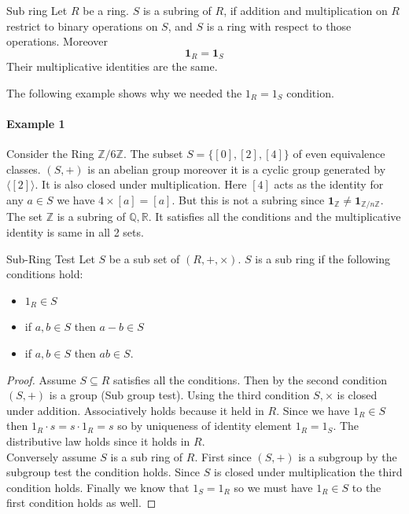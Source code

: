 \documentclass[16pt,a4paper]{article}
\theoremstyle{definition}
\newcommand{\ang}[1]{\langle #1 \rangle}
\begin{document}
\begin{defn}{Sub ring}{}
Let $R$ be a ring. $S$ is a subring of $R$, if addition and multiplication on $R$ restrict to binary operations on $S$, and $S$ is a ring with respect to those operations. Moreover
\[\mathbf{1}_R=\mathbf{1}_S\]
Their multiplicative identities are the same.  
\end{defn}

The following example shows why we needed the $1_R = 1_S$ condition. 

\paragraph{Example 1} Consider the Ring $\mathbb{Z}/6\mathbb{Z}$. The subset $S = \{[0],[2],[4]\}$ of even equivalence classes. $(S,+)$ is an abelian group moreover it is a cyclic group generated by $\ang{[2]}$. It is also closed under multiplication. Here $[4]$ acts as the identity for any $a\in S$ we have $4\times [a] = [a]$. But this is not a subring since $\mathbf{1}_\mathbb{Z}\neq \mathbf{1}_{\mathbb{Z}/n\mathbb{Z}}$.
\\

The set $\mathbb{Z}$ is a subring of $\mathbb{Q,R}$. It satisfies all the conditions and the multiplicative identity is same in all 2 sets. 

\newpage

\begin{thm}{Sub-Ring Test}{}
Let $S$ be a sub set of $(R,+, \times)$.  $S$ is a sub ring if the following conditions hold: 
\begin{itemize}
\item $1_R \in S$ 
\item if $a,b \in S$ then $a-b\in S$
\item if $a,b \in S$ then $ab\in S$. 
\end{itemize}
\end{thm}
\begin{proof}
Assume $S\subseteq R$ satisfies all the conditions. Then by the second condition $(S,+)$ is a group (Sub group test). Using the third condition $S,\times$ is closed under addition. Associatively holds because it held in $R$. Since we have $1_R \in S$ then $1_R\cdot s = s\cdot 1_R = s$ so by uniqueness of identity element $1_R = 1_S$. The distributive law holds since it holds in $R$.  
\\

Conversely assume $S$ is a sub ring of $R$. First since $(S,+)$ is a subgroup by the subgroup test the condition holds. Since $S$ is closed under multiplication the third condition holds. Finally we know that $1_S = 1_R$ so we must have $1_R\in S$ to the first condition holds as well. 


\end{proof}
\end{document}
